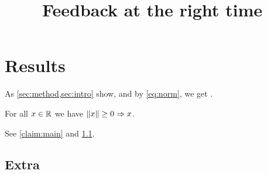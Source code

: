 \documentclass[11pt]{article}
\title{Feedback at the right time}
\begin{document}
\maketitle


\section{Results}\label{sec:results}
As \cref{sec:method,sec:intro} show, and by \eqref{eq:norm}, we get \cite{knuth84}.
\begin{claim}\label{claim:main}
For all $x \in \mathbb{R}$ we have $\lVert x \rVert \geq 0 \Rightarrow x$.
\end{claim}
See \autoref{claim:main} and \ref{sec:results-extra}.
\subsection{Extra}\label{sec:results-extra}
\printbibliography
\end{document}
